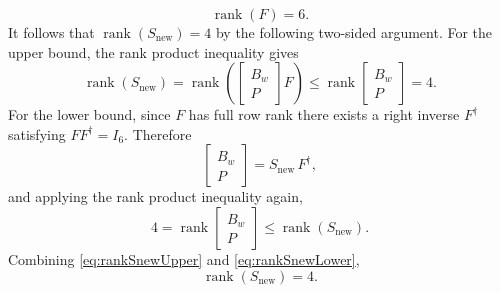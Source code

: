 \documentclass[11pt]{article}
\newcommand{\R}{\mathbb{R}}
\newcommand{\rank}{\operatorname{rank}}
\begin{document}
\begin{equation}
    \rank(F) = 6.
    \label{eq:rankF}
\end{equation}
It follows that $\rank(S_{\mathrm{new}}) = 4$ by the following two-sided
argument. For the upper bound, the rank product inequality gives
\begin{equation}
    \rank(S_{\mathrm{new}})
    = \rank\!\left(
        \begin{bmatrix} B_w \\ P \end{bmatrix} F
      \right)
    \leq
    \rank\!\begin{bmatrix} B_w \\ P \end{bmatrix}
    = 4.
    \label{eq:rankSnewUpper}
\end{equation}
For the lower bound, since $F$ has full row rank there exists a right inverse
$F^\dagger$ satisfying $F F^\dagger = I_6$. Therefore
\begin{equation}
    \begin{bmatrix} B_w \\ P \end{bmatrix}
    = S_{\mathrm{new}}\, F^\dagger,
    \label{eq:rightinverse}
\end{equation}
and applying the rank product inequality again,
\begin{equation}
    4 = \rank\!\begin{bmatrix} B_w \\ P \end{bmatrix}
    \leq \rank(S_{\mathrm{new}}).
    \label{eq:rankSnewLower}
\end{equation}
Combining \eqref{eq:rankSnewUpper} and \eqref{eq:rankSnewLower},
\begin{equation}
    \rank(S_{\mathrm{new}}) = 4.
    \label{eq:rankSnew}
\end{equation}




\end{document}
